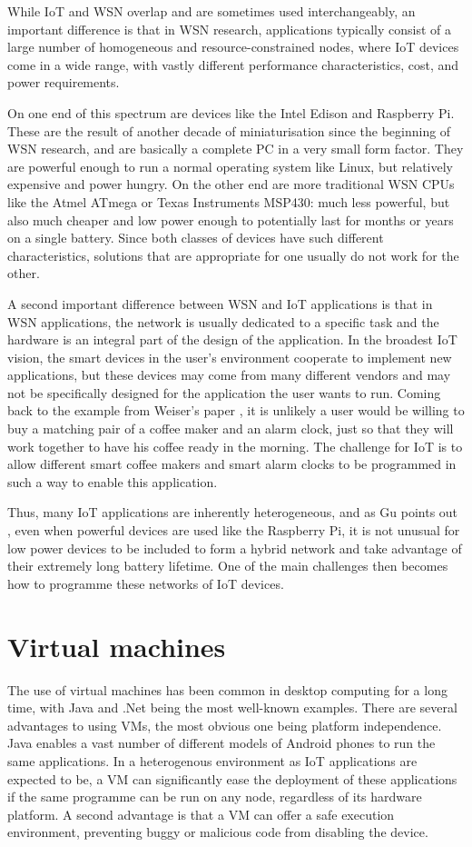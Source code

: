 While IoT and WSN overlap and are sometimes used interchangeably, an important difference is that in WSN research, applications typically consist of a large number of homogeneous and resource-constrained nodes, where IoT devices come in a wide range, with vastly different performance characteristics, cost, and power requirements.

On one end of this spectrum are devices like the Intel Edison and Raspberry Pi. These are the result of another decade of miniaturisation since the beginning of WSN research, and are basically a complete PC in a very small form factor. They are powerful enough to run a normal operating system like Linux, but relatively expensive and power hungry. On the other end are more traditional WSN CPUs like the Atmel ATmega or Texas Instruments MSP430: much less powerful, but also much cheaper and low power enough to potentially last for months or years on a single battery. Since both classes of devices have such different characteristics, solutions that are appropriate for one usually do not work for the other.

A second important difference between WSN and IoT applications is that in WSN applications, the network is usually dedicated to a specific task and the hardware is an integral part of the design of the application. In the broadest IoT vision, the smart devices in the user's environment cooperate to implement new applications, but these devices may come from many different vendors and may not be specifically designed for the application the user wants to run. Coming back to the example from Weiser's paper \cite{Weiser:1991wz}, it is unlikely a user would be willing to buy a matching pair of a coffee maker and an alarm clock, just so that they will work together to have his coffee ready in the morning. The challenge for IoT is to allow different smart coffee makers and smart alarm clocks to be programmed in such a way to enable this application.

Thus, many IoT applications are inherently heterogeneous, and as Gu points out \cite{Gu:2006ww}, even when powerful devices are used like the Raspberry Pi, it is not unusual for low power devices to be included to form a hybrid network and take advantage of their extremely long battery lifetime. One of the main challenges then becomes how to programme these networks of IoT devices.



\section{Virtual machines}
The use of virtual machines has been common in desktop computing for a long time, with Java and .Net being the most well-known examples. There are several advantages to using VMs, the most obvious one being platform independence. Java enables a vast number of different models of Android phones to run the same applications. In a heterogenous environment as IoT applications are expected to be, a VM can significantly ease the deployment of these applications if the same programme can be run on any node, regardless of its hardware platform. A second advantage is that a VM can offer a safe execution environment, preventing buggy or malicious code from disabling the device.

